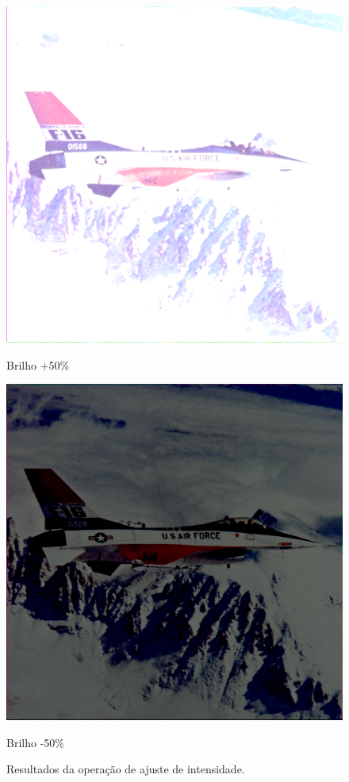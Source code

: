 \documentclass[a4paper, 11pt, portuguese]{article}
\begin{document}
\begin{figure}[htbp]
\begin{minipage}{0.32\textwidth}
    \includegraphics[width=\textwidth]{imagens/airplane_brighter_50.png}
    \caption*{Brilho +50\%}
\end{minipage}
\hfill
\begin{minipage}{0.32\textwidth}
    \centering
    \includegraphics[width=\textwidth]{imagens/airplane_darker_-50.png}
    \caption*{Brilho -50\%}
\end{minipage}
\caption{Resultados da operação de ajuste de intensidade.}
\label{fig:intensidade}
\end{figure}
\end{document}
